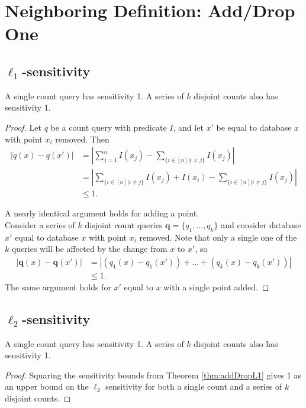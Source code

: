 \documentclass[11pt]{scrartcl} %
\begin{document}
\section{Neighboring Definition: Add/Drop One}
\subsection{$\ell_1$-sensitivity}
\begin{theorem}
\label{thm:addDropL1}
A single count query has sensitivity 1. A series of $k$ disjoint counts also has sensitivity 1.
\end{theorem}

\begin{proof}
Let $q$ be a count query with predicate $I$, and let $x'$ be equal to database $x$ with point $x_i$ removed. Then 
\begin{align*}
\left \vert q(x) - q(x') \right\vert &= \left\vert \sum_{j=1}^n I(x_j) - \sum_{\{ i \in [n] \vert i \ne j\}} I(x_j) \right\vert\\
	&= \left\vert \sum_{\{ i \in [n] \vert i \ne j\}} I(x_j) + I(x_i) - \sum_{\{ i \in [n] \vert i \ne j\}} I(x_j) \right\vert\\
	&\le 1.
\end{align*}

A nearly identical argument holds for adding a point. \\

Consider a series of $k$ disjoint count queries $\mathbf{q} = \{q_1, \ldots, q_k\}$ and consider database $x'$ equal to database $x$ with point $x_i$ removed. Note that only a single one of the $k$ queries will be affected by the change from $x$ to $x'$, so
\begin{align*}
\left\vert \mathbf{q}(x) - \mathbf{q}(x') \right\vert &= \left\vert \left(q_1(x) - q_1(x')\right) + \ldots + \left(q_k(x) - q_k(x')\right) \right\vert \\
	&\le 1.
\end{align*}
The same argument holds for $x'$ equal to $x$ with a single point added.
\end{proof}
\subsection{$\ell_2$-sensitivity}
\begin{theorem}
A single count query has sensitivity 1. A series of $k$ disjoint counts also has sensitivity 1.
\end{theorem}

\begin{proof}
Squaring the sensitivity bounds from Theorem \ref{thm:addDropL1} gives 1 as an upper bound on the $\ell_2$ sensitivity for both a single count and a series of $k$ disjoint counts.
\end{proof}
% 
% 
\end{document}

